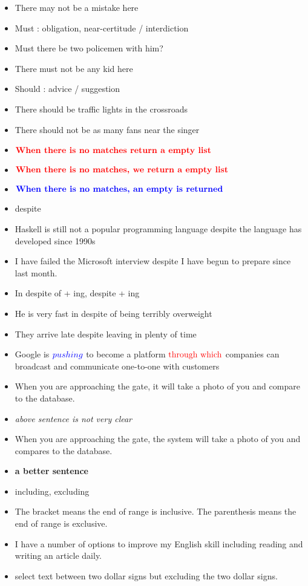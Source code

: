 \documentclass{article}
\begin{document}
\begin{itemize}
\item[] There may not be a mistake here
\item Must : obligation, near-certitude / interdiction
\item[] Must there be two policemen with him?
\item[] There must not be any kid here
\item Should : advice / suggestion
\item[] There should be traffic lights in the crossroads
\item[] There should not be as many fans near the singer
\item $\color{red}{\textbf{When there is no matches return a empty list}}$
\item $\color{red}{\textbf{When there is no matches, we return a empty list}}$
\item $\color{blue}{\textbf{When there is no matches, an empty is returned}}$
\end{itemize}
\begin{itemize}
\item despite 
\item[] Haskell is still not a popular programming language despite the language has developed since 1990s
\item I have failed the Microsoft interview despite I have begun to prepare since last month. 
\item In despite of + ing,  despite + ing
\item[] He is very fast in despite of being terribly overweight 
\item[] They arrive late despite leaving in plenty of time  
\item Google is $\color{blue}{pushing}$ to become a platform $\color{red}{\mbox{through which}}$ companies can broadcast and communicate one-to-one with customers
\item When you are approaching the gate, it will take a photo of you and compare to the database.
\item[] \textit{above sentence is not very clear}
\item When you are approaching the gate, the system will take a photo of you and compares to the database.
\item[] \textbf{a better sentence}
\item including, excluding
\item[] The bracket means the end of range is inclusive. The parenthesis means the end of range is exclusive.
\item[] I have a number of options to improve my English skill including reading and writing an article daily.
\item[] select text between two dollar signs but excluding the two dollar signs.
\end{itemize}
\end{document}
